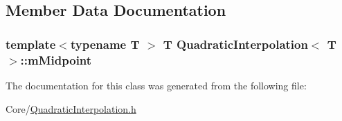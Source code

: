 \subsection{Member Data Documentation}
\subsubsection[{\texorpdfstring{m\+Midpoint}{mMidpoint}}]{\setlength{\rightskip}{0pt plus 5cm}template$<$typename T $>$ T {\bf Quadratic\+Interpolation}$<$ T $>$\+::m\+Midpoint\hspace{0.3cm}{\ttfamily [private]}}\hypertarget{classQuadraticInterpolation_a18be058d9d18b98195b6a1fcb25ec1c0}{}\label{classQuadraticInterpolation_a18be058d9d18b98195b6a1fcb25ec1c0}


The documentation for this class was generated from the following file\+:\begin{DoxyCompactItemize}
\item 
Core/\hyperlink{QuadraticInterpolation_8h}{Quadratic\+Interpolation.\+h}\end{DoxyCompactItemize}
